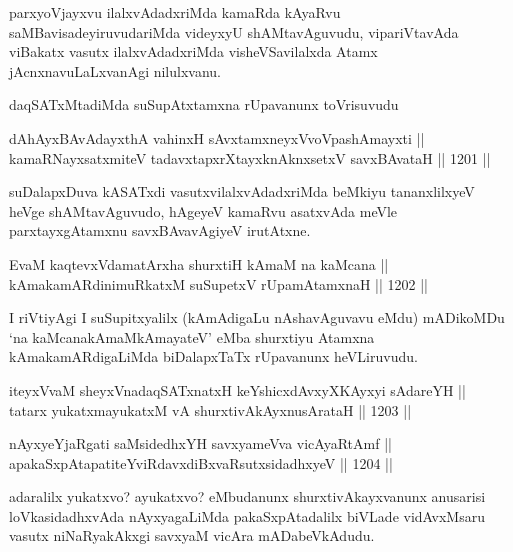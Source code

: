 \begin{artha}
parxyoVjayxvu ilalxvAdadxriMda kamaRda kAyaRvu saMBavisadeyiruvudariMda videyxyU shAMtavAguvudu, vipariVtavAda viBakatx vasutx ilalxvAdadxriMda visheVSavilalxda Atamx jAcnxnavuLaLxvanAgi nilulxvanu.
\end{artha}

\begin{artha}
daqSATxMtadiMda suSupAtxtamxna rUpavanunx toVrisuvudu
\end{artha}

\begin{shl}
dAhAyxBAvAdayxthA vahinxH sAvxtamxneyxVvoVpashAmayxti ||  \\
kamaRNayxsatxmiteV tadavxtapxrXtayxknAknxsetxV savxBAvataH \hfill || 1201 ||  
\end{shl}

\begin{artha}
suDalapxDuva kASATxdi vasutxvilalxvAdadxriMda beMkiyu tananxlilxyeV heVge shAMtavAguvudo, hAgeyeV kamaRvu asatxvAda meVle parxtayxgAtamxnu savxBAvavAgiyeV irutAtxne.
\end{artha}

\begin{shl}
EvaM kaqtevxVdamatArx\s \s ha shurxtiH kAmaM na kaMcana || \\
kAmakamARdinimuRkatxM suSupetxV rUpamAtamxnaH \hfill || 1202 ||  
\end{shl}

\begin{artha}
I riVtiyAgi I suSupitxyalilx (kAmAdigaLu nAshavAguvavu eMdu) mADikoMDu `na kaMcanakAmaMkAmayateV' eMba shurxtiyu Atamxna kAmakamARdigaLiMda biDalapxTaTx rUpavanunx heVLiruvudu.
\end{artha}


\begin{shl}
iteyxVvaM sheyxVnadaqSATxnatxH keYshicxdAvxyXKAyxyi sAdareYH || \\
tatarx yukatxmayukatxM vA shurxtivAkAyxnusArataH \hfill || 1203 ||  
\end{shl}

\begin{shl}
nAyxyeYjaRgati saMsidedhxYH savxyameVva vicAyaRtAmf || \\
apakaSxpAtapatiteYviRdavxdiBxvaRsutxsidadhxyeV \hfill || 1204 ||  
\end{shl}

\begin{artha}
adaralilx yukatxvo? ayukatxvo? eMbudanunx shurxtivAkayxvanunx anusarisi loVkasidadhxvAda nAyxyagaLiMda pakaSxpAtadalilx biVLade vidAvxMsaru vasutx niNaRyakAkxgi savxyaM vicAra mADabeVkAdudu.
\end{artha}

